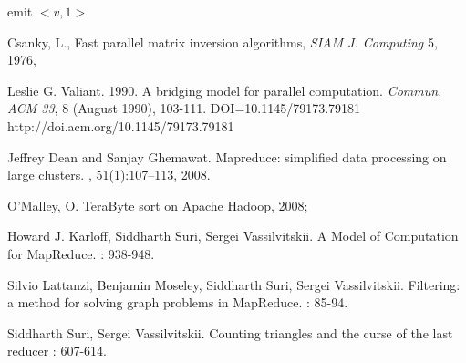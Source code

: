 \documentclass[11pt]{article}
\newcommand{\tab}[1]{\hspace{.05\textwidth}\rlap{#1}}
\begin{document}
\tab{}\tab{}\tab{} emit $<v, 1>$



\begin{thebibliography}{42}

Csanky, L., Fast parallel matrix inversion algorithms, {\em SIAM J. Computing} 5, 1976,

Leslie G. Valiant. 1990. A bridging model for parallel computation. {\em Commun. ACM 33}, 8 (August 1990), 103-111. DOI=10.1145/79173.79181 http://doi.acm.org/10.1145/79173.79181

Jeffrey Dean and Sanjay Ghemawat.
\newblock Mapreduce: simplified data processing on large clusters.
, 51(1):107--113, 2008.

 O'Malley, O. TeraByte sort on Apache Hadoop, 2008;

Howard J. Karloff, Siddharth Suri, Sergei Vassilvitskii.
\newblock  A Model of Computation for MapReduce.
: 938-948.

Silvio Lattanzi, Benjamin Moseley, Siddharth Suri, Sergei Vassilvitskii. 
\newblock  Filtering: a method for solving graph problems in MapReduce. 
: 85-94.

Siddharth Suri, Sergei Vassilvitskii.  
\newblock  Counting triangles and the curse of the last reducer
: 607-614.

  
\end{thebibliography}
\end{document}

